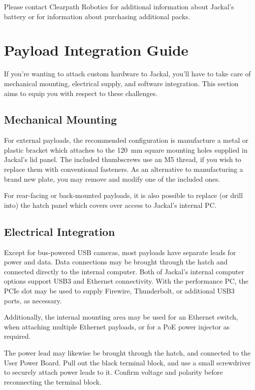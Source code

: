 \documentclass[]{clearpath-manual}
\begin{document}
Please contact Clearpath Robotics for additional information about Jackal's battery or
for information about purchasing additional packs.


\section{Payload Integration Guide}

If you're wanting to attach custom hardware to Jackal, you'll have to take care of
mechanical mounting, electrical supply, and software integration. This section
aims to equip you with respect to these challenges.


\subsection{Mechanical Mounting}

For external payloads, the recommended configuration is manufacture a metal or plastic bracket
which attaches to the \SI{120}{\mm} square mounting holes supplied in Jackal's lid
panel. The included thumbscrews use an M5 thread, if you wish to replace them with conventional
fasteners. As an alternative to manufacturing a brand new plate, you may remove and modify one
of the included ones.

For rear-facing or back-mounted payloads, it is also possible to replace (or drill into) the
hatch panel which covers over access to Jackal's internal PC.

\subsection{Electrical Integration}\label{payload-elec}

Except for bus-powered USB cameras, most payloads have separate leads for power and data. Data
connections may be brought through the hatch and connected directly to the internal computer. Both
of Jackal's internal computer options support USB3 and Ethernet connectivity. With the performance
PC, the PCIe slot may be used to supply Firewire, Thunderbolt, or additional USB3 ports, as necessary.

Additionally, the internal mounting area may be used for an Ethernet switch, when attaching multiple
Ethernet payloads, or for a PoE power injector as required.

The power lead may likewise be brought through the hatch, and connected to the User Power Board. Pull
out the black terminal block, and use a small screwdriver to securely attach power leads to it.
Confirm voltage and polarity before reconnecting the terminal block.
\end{document}
